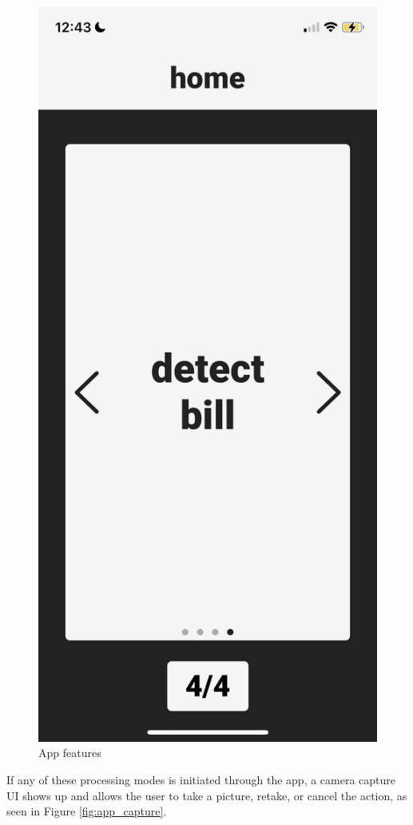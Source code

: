 \documentclass[a4paper,11pt]{article}
\begin{document}
\begin{figure}[H]
\includegraphics[scale=0.1]{img/app/landing4.png}
\caption{App features}
\label{fig:app_features}
\end{figure}

If any of these processing modes is initiated through the app, a camera capture UI shows up and allows the user to take a picture, retake, or cancel the action, as seen in Figure \ref{fig:app_capture}.
\end{document}
